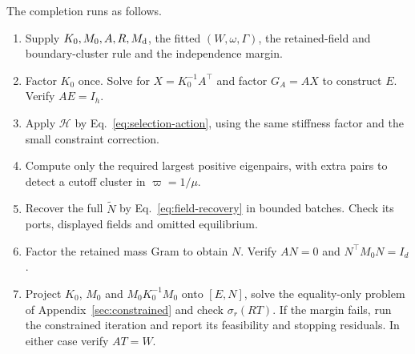 The completion runs as follows.
\begin{enumerate}
\item Supply $K_0,M_0,A,R,M_{\rm d}$, the fitted $(W,\omega,\Gamma)$,
the retained-field and boundary-cluster rule and the independence margin.
\item Factor $K_0$ once. Solve for $X=K_0^{-1}A^{\top}$ and factor
$G_A=AX$ to construct $E$. Verify $AE=I_h$.
\item Apply $\mathcal H$ by Eq.~\eqref{eq:selection-action}, using the same
stiffness factor and the small constraint correction.
\item Compute only the required largest positive eigenpairs, with extra
pairs to detect a cutoff cluster in $\varpi=1/\mu$.
\item Recover the full $\widetilde N$ by Eq.~\eqref{eq:field-recovery} in
bounded batches. Check its ports, displayed fields and omitted equilibrium.
\item Factor the retained mass Gram to obtain $N$. Verify
$AN=0$ and $N^{\top}M_0N=I_d$.
\item Project $K_0$, $M_0$ and $M_0K_0^{-1}M_0$ onto $[E,N]$, solve the
equality-only problem of Appendix~\ref{sec:constrained} and check $\sigma_r(RT)$. If the margin fails,
run the constrained iteration and report its feasibility and stopping
residuals. In either case verify $AT=W$.
\end{enumerate}

